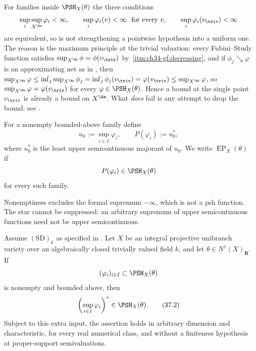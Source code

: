 \begin{remark}
\label{rem:ch37-pointwise-equals-uniform}
For families inside $\PSH_X(\theta)$ the three conditions
\[
 \sup_i\sup_{X^{\An}}\varphi_i<\infty,
 \qquad
 \sup_i\varphi_i(v)<\infty\ \text{ for every }v,
 \qquad
 \sup_i\varphi_i(v_{\triv})<\infty
\]
are equivalent, so  is not strengthening a
pointwise hypothesis into a uniform one.  The reason is the maximum
principle at the trivial valuation: every Fubini--Study function satisfies
$\sup_{X^{\An}}\phi=\phi(v_{\triv})$ by
\,\cref{itm:ch34-gf:decreasing}, and if
$\phi_j\searrow\varphi$ is an approximating net as in
, then
$\sup_{X^{\An}}\varphi\leq\inf_j\sup_{X^{\An}}\phi_j
 =\inf_j\phi_j(v_{\triv})=\varphi(v_{\triv})\leq\sup_{X^{\An}}\varphi$,
so $\sup_{X^{\An}}\varphi=\varphi(v_{\triv})$ for every
$\varphi\in\PSH_X(\theta)$.  Hence a bound at the single point
$v_{\triv}$ is already a bound on $X^{\An}$.  What \emph{does} fail is
any attempt to drop the bound: see
.
\end{remark}

\begin{definition}
\label{def:bj-envelope-property-final}
For a nonempty bounded-above family define
\[
 u_0:=\sup_{i\in I}\varphi_i,
 \qquad
 P(\varphi_i):=u_0^*,
\tag{37.1}\label{eq:bj-envelope-definition}
\]
where $u_0^*$ is the least upper semicontinuous majorant of $u_0$.
We write $\operatorname{EP}_X(\theta)$ if
\[
                    P(\varphi_i)\in\PSH_X(\theta)
\]
for every such family.
\end{definition}

Nonemptiness excludes the formal supremum $-\infty$, which is not a psh
function.  The star cannot be suppressed: an arbitrary supremum of upper
semicontinuous functions need not be upper semicontinuous.

\begin{theorem}\label{thm:bj-final-envelope}
Assume $\mathrm{(SD)}_k$ as specified in
. Let $X$ be an integral projective
unibranch variety over an algebraically closed trivially valued field $k$,
and let
$\theta\in N^1(X)_{\mathbf R}$.  If
\[
               (\varphi_i)_{i\in I}\subset\PSH_X(\theta)
\]
is nonempty and bounded above, then
\[
             \left(\sup_{i\in I}\varphi_i\right)^*
                    \in\PSH_X(\theta).
\tag{37.2}\label{eq:bj-final-envelope}
\]
Subject to this extra input, the assertion holds in arbitrary dimension
and characteristic, for every
real numerical class, and without a finiteness hypothesis at
proper-support semivaluations.
\end{theorem}

